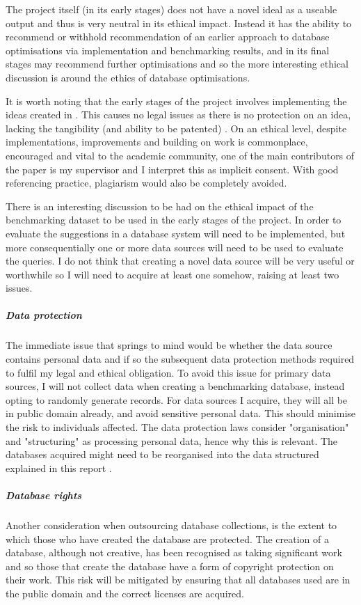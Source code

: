 The project itself (in its early stages) does not have a novel ideal as a useable output and thus is very neutral in its ethical impact. Instead it has the ability to recommend or withhold recommendation of an earlier approach to database optimisations via implementation and benchmarking results, and in its final stages may recommend further optimisations and so the more interesting ethical discussion is around the ethics of database optimisations.


It is worth noting that the early stages of the project involves implementing the ideas created in \cite{RelationalAlgebraByWayOfAdjunctions}. This causes no legal issues as there is no protection on an idea, lacking the tangibility (and ability to be patented) . On an ethical level, despite implementations, improvements and building on work is commonplace, encouraged and vital to the academic community, one of the main contributors of the paper is my supervisor and I interpret this as implicit consent. With good referencing practice, plagiarism would also be completely avoided.

There is an interesting discussion to be had on the ethical impact of the benchmarking dataset to be used in the early stages of the project. In order to evaluate the suggestions in \cite{RelationalAlgebraByWayOfAdjunctions} a database system will need to be implemented, but more consequentially one or more data sources will need to be used to evaluate the queries. I do not think that creating a novel data source will be very useful or worthwhile so I will need to acquire at least one somehow, raising at least two issues.
\subparagraph*{Data protection} The immediate issue that springs to mind would be whether the data source contains personal data and if so the subsequent data protection methods required to fulfil my legal and ethical obligation. To avoid this issue for primary data sources, I will not collect data when creating a benchmarking database, instead opting to randomly generate records. For data sources I acquire, they will all be in public domain already, and avoid sensitive personal data. This should minimise the risk to individuals affected. The data protection laws consider "organisation" and "structuring" as processing personal data, hence why this is relevant. The databases acquired might need to be reorganised into the data structured explained in this report .  
\subparagraph*{Database rights} Another consideration when outsourcing database collections, is the extent to which those who have created the database are protected. The creation of a database, although not creative, has been recognised as taking significant work and so those that create the database have a form of copyright protection on their work.  This risk will be mitigated by ensuring that all databases used are in the public domain and the correct licenses are acquired.

